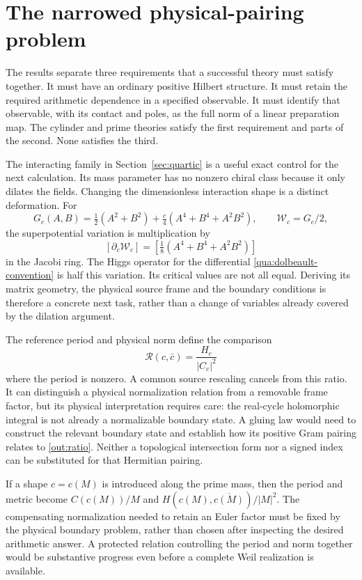\section{The narrowed physical-pairing problem}
\label{sec:outlook}
The results separate three requirements that a successful theory must satisfy together. It must have an ordinary positive Hilbert structure. It must retain the required arithmetic dependence in a specified observable. It must identify that observable, with its contact and poles, as the full norm of a linear preparation map. The cylinder and prime theories satisfy the first requirement and parts of the second. None satisfies the third.

The interacting family in Section~\ref{sec:quartic} is a useful exact control for the next calculation. Its mass parameter has no nonzero chiral class because it only dilates the fields. Changing the dimensionless interaction shape is a distinct deformation. For
\[
G_c(A,B)=\tfrac12(A^2+B^2)+\tfrac c4(A^4+B^4+A^2B^2),
\qquad \mathcal W_c=G_c/2,
\]
the superpotential variation is multiplication by
\[
[\partial_c\mathcal W_c]
=\left[\tfrac18(A^4+B^4+A^2B^2)\right]
\]
in the Jacobi ring. The Higgs operator for the differential \eqref{qua:dolbeault-convention} is half this variation. Its critical values are not all equal. Deriving its matrix geometry, the physical source frame and the boundary conditions is therefore a concrete next task, rather than a change of variables already covered by the dilation argument.

The reference period and physical norm define the comparison
\begin{equation}\label{out:ratio}
\mathcal R(c,\bar c)=\frac{H_c}{|C_c|^2}
\end{equation}
where the period is nonzero. A common source rescaling cancels from this ratio. It can distinguish a physical normalization relation from a removable frame factor, but its physical interpretation requires care: the real-cycle holomorphic integral is not already a normalizable boundary state. A gluing law would need to construct the relevant boundary state and establish how its positive Gram pairing relates to \eqref{out:ratio}. Neither a topological intersection form nor a signed index can be substituted for that Hermitian pairing.

If a shape $c=c(M)$ is introduced along the prime mass, then the period and metric become $C(c(M))/M$ and $H(c(M),\overline{c(M)})/|M|^2$. The compensating normalization needed to retain an Euler factor must be fixed by the physical boundary problem, rather than chosen after inspecting the desired arithmetic answer. A protected relation controlling the period and norm together would be substantive progress even before a complete Weil realization is available.

